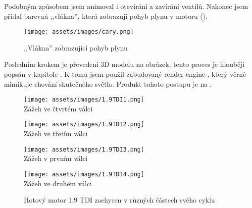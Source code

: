 \newpage

{Podobným způsobem jsem animoval i otevírání a zavírání ventilů. Nakonec jsem přidal barevná ,,vlákna'', která zobrazují pohyb plynu v motoru ().}

\begin{figure}[H]
    \centering
    \texttt{[image: assets/images/cary.png]}
    \caption{,,Vlákna'' zobrazující pohyb plynu \jaObr}
    \label{obr:1.9TDICary}
\end{figure}

{Posledním krokem je převedení 3D modelu na obrázek, tento proces je hlouběji popsán v kapitole . K tomu jsem použil zabudovaný render engine , který věrně mimikuje chování skutečného světla. Produkt tohoto postupu je na .}

\begin{figure}[H]
    \begin{minipage}[b]{0.5\linewidth}
        \centering
        \texttt{[image: assets/images/1.9TDI1.png]}\\
        {Zážeh ve čtvrtém válci}
        \vspace{4ex}
    \end{minipage}
    \begin{minipage}[b]{0.5\linewidth}
        \centering
        \texttt{[image: assets/images/1.9TDI2.png]}\\
        {Zážeh ve třetím válci}
        \vspace{4ex}
    \end{minipage}
    \begin{minipage}[b]{0.5\linewidth}
        \centering
        \texttt{[image: assets/images/1.9TDI3.png]}\\
        {Zážeh v prvním válci}
        \vspace{4ex}
    \end{minipage}
    \begin{minipage}[b]{0.5\linewidth}
        \centering
        \texttt{[image: assets/images/1.9TDI4.png]}\\
        {Zážeh ve druhém válci}
        \vspace{4ex}
    \end{minipage}
    \caption{Hotový motor 1.9 TDI zachycen v různých částech svého cyklu \jaObr}
    \label{obr:1.9TDIUkazkaHotovo}
\end{figure}

\newpage

